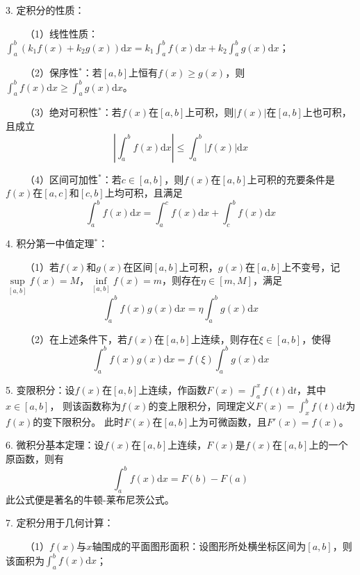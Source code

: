 3. 定积分的性质：

~~~~（1）线性性质：$\int_a^b \left(k_1f(x)+k_2g(x)\right)\mathrm{d}x=k_1\int_a^bf(x)\mathrm{d}x+k_2\int_a^bg(x)\mathrm{d}x$；

~~~~（2）保序性$^*$：若$[a,b]$上恒有$f(x)\geqslant g(x)$，则$\int_a^b f(x)\mathrm{d}x\geqslant \int_a^b g(x)\mathrm{d}x$。

~~~~（3）绝对可积性$^*$：若$f(x)$在$[a,b]$上可积，则$\left|f(x)\right|$在$[a,b]$上也可积，且成立
\begin{equation*}
    \left|\int_a^bf(x)\mathrm{d}x\right|\leqslant \int_a^b \left|f(x)\right|\mathrm{d}x
\end{equation*}

~~~~（4）区间可加性$^*$：若$c\in [a,b]$，则$f(x)$在$[a,b]$上可积的充要条件是$f(x)$在$[a,c]$和$[c,b]$上均可积，且满足
\begin{equation*}
    \int_a^b f(x)\mathrm{d}x=\int_a^c f(x)\mathrm{d}x+\int_c^b f(x)\mathrm{d}x
\end{equation*}

4. 积分第一中值定理$^*$：

~~~~（1）若$f(x)$和$g(x)$在区间$[a,b]$上可积，$g(x)$在$[a,b]$上不变号，记$\sup\limits_{[a,b]}f(x)=M$，$\inf\limits_{[a,b]}f(x)=m$，则存在$\eta \in [m,M]$，满足
\begin{equation*}
    \int_a^b f(x)g(x)\mathrm{d}x=\eta \int_a^b g(x)\mathrm{d}x
\end{equation*}

~~~~（2）在上述条件下，若$f(x)$在$[a,b]$上连续，则存在$\xi \in [a,b]$，使得
\begin{equation*}
    \int_a^b f(x)g(x)\mathrm{d}x =f(\xi) \int_a^b g(x)\mathrm{d}x
\end{equation*}

5. 变限积分：设$f(x)$在$[a,b]$上连续，作函数$F(x)=\int_a^x f(t)\mathrm{d}t$，其中$x \in [a,b]$，
则该函数称为$f(x)$的变上限积分，同理定义$F(x)=\int_x^b f(t)\mathrm{d}t$为$f(x)$的变下限积分。
此时$F(x)$在$[a,b]$上为可微函数，且$F'(x)=f(x)$。

6. 微积分基本定理：设$f(x)$在$[a,b]$上连续，$F(x)$是$f(x)$在$[a,b]$上的一个原函数，则有
\begin{equation*}
    \int_a^b f(x)\mathrm{d}x=F(b)-F(a)
\end{equation*}
此公式便是著名的牛顿-莱布尼茨公式。

7. 定积分用于几何计算：

~~~~（1）$f(x)$与$x$轴围成的平面图形面积：设图形所处横坐标区间为$[a,b]$，则该面积为$\int_a^b f(x)\mathrm{d} x$；

